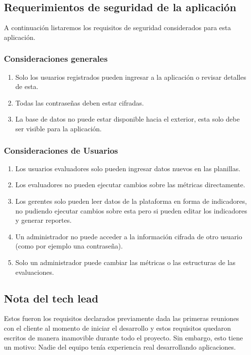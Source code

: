 \subsection{Requerimientos de seguridad de la aplicación}

A continuación listaremos los requisitos de seguridad considerados para esta aplicación. 

\subsubsection{Consideraciones generales}
\begin{enumerate}
    \item Solo los usuarios registrados pueden ingresar a la aplicación o revisar detalles de esta.
    \item Todas las contraseñas deben estar cifradas.
    \item La base de datos no puede estar disponible hacia el exterior, esta solo debe ser visible para la aplicación.
\end{enumerate}

\subsubsection{Consideraciones de Usuarios}
\begin{enumerate}
    \item Los usuarios evaluadores solo pueden ingresar datos nuevos en las planillas.
    \item Los evaluadores no pueden ejecutar cambios sobre las métricas directamente.
    \item Los gerentes solo pueden leer datos de la plataforma en forma de indicadores, no pudiendo ejecutar cambios sobre esta pero si pueden editar los indicadores y generar reportes.
    \item Un administrador no puede acceder a la información cifrada de otro usuario (como por ejemplo una contraseña).
    \item Solo un administrador puede cambiar las métricas o las estructuras de las evaluaciones.
\end{enumerate}

\subsection{Nota del tech lead}

Estos fueron los requisitos declarados previamente dada las primeras reuniones con el cliente al momento de iniciar el desarrollo y estos requisitos quedaron escritos de manera inamovible durante todo el proyecto. Sin embargo, esto tiene un motivo: Nadie del equipo tenía experiencia real desarrollando aplicaciones.

